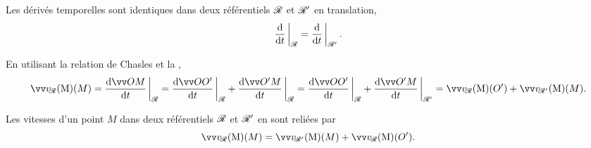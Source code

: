 \documentclass[12pt,fancy]{cours}
\begin{document}
\begin{prop}\label{prop:deriv_R}
Les dérivés temporelles sont identiques dans deux référentiels $\mathcal{R}$ et $\mathcal{R}'$ en translation,
\begin{equation*}\label{eq:deriv_R}
\dR{}{t}{\Rcal} = \dR{}{t}{\Rcal'}.
\end{equation*}
\end{prop}


En utilisant la relation de Chasles  et la ,
\begin{equation}\label{eq:relat_trans}
\vR(M)  = \dR{\Vec{OM}}{t}{\Rcal} = \dR{\Vec {OO'}}{t}{\Rcal} +  \dR{\Vec {O'M}}{t}{\Rcal} = \dR{\Vec {OO'}}{t}{\Rcal} +  \dR{\Vec {O'M}}{t}{\Rcal'} = \vR(O') +  \vRp(M).
\end{equation}

\begin{theorem}\label{form:compov}
Les vitesses d'un point $M$ dans deux référentiels $\mathcal{R}$ et $\mathcal{R}'$ en  sont reliées par
\begin{equation*}
\vR(M) = \vRp(M) + \vR(O').
\end{equation*}
\end{theorem}
%
\end{document}
